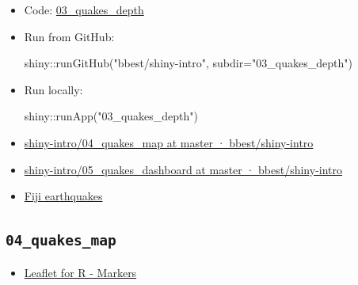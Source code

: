 \documentclass[
  letterpaper,
  DIV=11,
  numbers=noendperiod]{scrreprt}
\newenvironment{Shaded}{\begin{snugshade}}{\end{snugshade}}
\newcommand{\AttributeTok}[1]{\textcolor[rgb]{0.40,0.45,0.13}{#1}}
\newcommand{\FunctionTok}[1]{\textcolor[rgb]{0.28,0.35,0.67}{#1}}
\newcommand{\NormalTok}[1]{\textcolor[rgb]{0.00,0.23,0.31}{#1}}
\newcommand{\SpecialCharTok}[1]{\textcolor[rgb]{0.37,0.37,0.37}{#1}}
\newcommand{\StringTok}[1]{\textcolor[rgb]{0.13,0.47,0.30}{#1}}
\providecommand{\tightlist}{%
  \setlength{\itemsep}{0pt}\setlength{\parskip}{0pt}}\usepackage{longtable,booktabs,array}
\begin{document}
\begin{itemize}
\item
  Code:
  \href{https://github.com/bbest/shiny-intro/tree/master/03_quakes_depth}{03\_quakes\_depth}
\item
  Run from GitHub:

\begin{Shaded}
\begin{Highlighting}[]
\NormalTok{shiny}\SpecialCharTok{::}\FunctionTok{runGitHub}\NormalTok{(}\StringTok{"bbest/shiny{-}intro"}\NormalTok{, }\AttributeTok{subdir=}\StringTok{"03\_quakes\_depth"}\NormalTok{)}
\end{Highlighting}
\end{Shaded}
\item
  Run locally:

\begin{Shaded}
\begin{Highlighting}[]
\NormalTok{shiny}\SpecialCharTok{::}\FunctionTok{runApp}\NormalTok{(}\StringTok{"03\_quakes\_depth"}\NormalTok{)}
\end{Highlighting}
\end{Shaded}
\item
  \href{https://github.com/bbest/shiny-intro/tree/master/04_quakes_map}{shiny-intro/04\_quakes\_map
  at master · bbest/shiny-intro}
\item
  \href{https://github.com/bbest/shiny-intro/tree/master/05_quakes_dashboard}{shiny-intro/05\_quakes\_dashboard
  at master · bbest/shiny-intro}
\item
  \href{http://benbestphd.com/shiny-intro/crosstalk.html}{Fiji
  earthquakes}
\end{itemize}

\hypertarget{quakes_map}{%
\subsection{\texorpdfstring{\texttt{04\_quakes\_map}}{04\_quakes\_map}}\label{quakes_map}}

\begin{itemize}
\tightlist
\item
  \href{http://rstudio.github.io/leaflet/markers.html\#icon-markers}{Leaflet
  for R - Markers}
\end{itemize}
\end{document}
